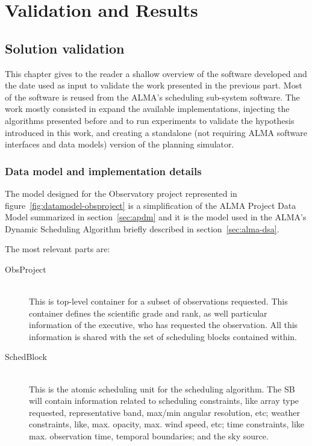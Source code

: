 \part{Validation and Results}

\chapter{Solution validation}

This chapter gives to the reader a shallow overview of the software developed and the date used as input to validate the work presented in the previous part. Most of the software is reused from the ALMA's scheduling sub-system software. The work mostly consisted in expand the available implementations, injecting the algorithms presented before and to run experiments to validate the hypothesis introduced in this work, and creating a standalone (not requiring ALMA software interfaces and data models) version of the planning simulator. 

\section {Data model and implementation details}

The model designed for the Observatory project represented in figure~\ref{fig:datamodel-obsproject} is a simplification of the ALMA Project Data Model summarized in section~\ref{sec:apdm} and it is the model used in the ALMA's Dynamic Scheduling Algorithm briefly described in section~\ref{sec:alma-dsa}.

The most relevant parts are: 
\begin{description}
\item[ObsProject] \hfill \\
This is top-level container for a subset of observations requested. This container defines the scientific grade and rank, as well particular information of the executive, who has requested the observation. All this information is shared with the set of scheduling blocks contained within.
\item[SchedBlock] \hfill \\
This is the atomic scheduling unit for the scheduling algorithm. The SB will contain information related to scheduling constraints, like array type requested, representative band, max/min angular resolution, etc; weather constraints, like, max. opacity, max. wind speed, etc; time constraints, like max. observation time, temporal boundaries; and the sky source.
\end{description}

